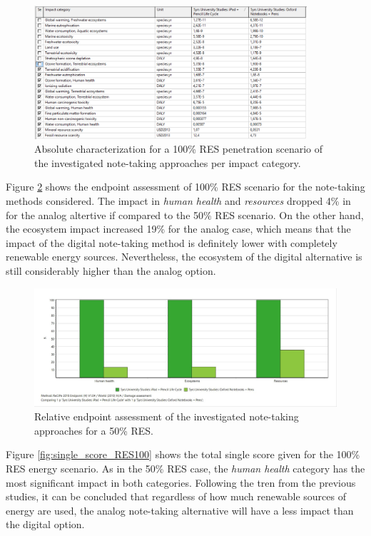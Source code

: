 \begin{figure}[H]
    \centering
    \includegraphics[width=0.9\textwidth]{images/RES_100/Characterization_Table_RES_100.PNG}
    \caption{Absolute characterization for a 100\% RES penetration scenario of the investigated note-taking approaches per impact category.}\label{fig:characterization_table_RES_100}
\end{figure}

Figure \ref{fig:damage_assessment_RES_100} shows the endpoint assessment of 100\% RES scenario for the note-taking methods considered. The impact in \textit{human health} and \textit{resources} dropped 4\% in for the analog altertive if compared to the 50\% RES scenario. On the other hand, the ecosystem impact increased 19\% for the analog case, which means that the impact of the digital note-taking method is definitely lower with completely renewable energy sources. Nevertheless, the ecosystem of the digital alternative is still considerably higher than the analog option. 

\begin{figure}[H]
    \centering
    \includegraphics[width=\textwidth]{images/RES_100/Damage_Assessment_RES_100.JPG}
    \caption{Relative endpoint assessment of the investigated note-taking approaches for a 50\% RES.}\label{fig:damage_assessment_RES_100}
\end{figure}

Figure \ref{fig:single_score_RES100} shows the total single score given for the 100\% RES energy scenario. As in the 50\% RES case, the \textit{human health} category has the most significant impact in both categories. Following the tren from the previous studies, it can be concluded that regardless of how much renewable sources of energy are used, the analog note-taking alternative will have a less impact than the digital option.

